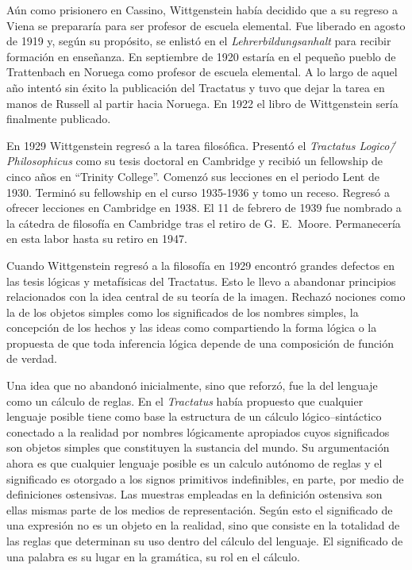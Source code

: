
Aún como prisionero en Cassino, Wittgenstein había decidido que a su regreso a
Viena se prepararía para ser profesor de escuela
elemental\autocite[cf.~][p.~158]{monk1991duty}. Fue liberado en agosto de 1919
y, según su propósito, se enlistó en el \emph{Lehrerbildungsanhalt} para recibir
formación en enseñanza. En septiembre de 1920 estaría en el pequeño pueblo de
Trattenbach en Noruega como profesor de escuela elemental. A lo largo de aquel
año intentó sin éxito la publicación del Tractatus y tuvo que dejar la tarea en
manos de Russell al partir hacia Noruega. En 1922 el libro de Wittgenstein sería
finalmente publicado.

En 1929 Wittgenstein regresó a la tarea filosófica. Presentó el \emph{Tractatus
  Logico\=/Philosophicus} como su tesis doctoral en Cambridge y recibió un
fellowship de cinco años en ``Trinity College''. Comenzó sus lecciones en el
periodo Lent de 1930. Terminó su fellowship en el curso 1935-1936 y tomo un
receso. Regresó a ofrecer lecciones en Cambridge en 1938. El 11 de febrero de
1939 fue nombrado a la cátedra de filosofía en Cambridge tras el retiro de
G.~E.~Moore. Permanecería en esta labor hasta su retiro en 1947.

Cuando Wittgenstein regresó a la filosofía en 1929 encontró grandes defectos en
las tesis lógicas y metafísicas del Tractatus. Esto le llevo a abandonar
principios relacionados con la idea central de su teoría de la imagen. Rechazó
nociones como la de los objetos simples como los significados de los nombres
simples, la concepción de los hechos y las ideas como compartiendo la forma
lógica o la propuesta de que toda inferencia lógica depende de una composición
de función de verdad\autocite[cf.~][p.~44]{rulesngrammar}.

Una idea que no abandonó inicialmente, sino que reforzó, fue la del lenguaje
como un cálculo de reglas. En el \emph{Tractatus} había propuesto que cualquier
lenguaje posible tiene como base la estructura de un cálculo lógico--sintáctico
conectado a la realidad por nombres lógicamente apropiados cuyos significados
son objetos simples que constituyen la sustancia del mundo. Su argumentación
ahora es que cualquier lenguaje posible es un calculo autónomo de reglas y el
significado es otorgado a los signos primitivos indefinibles, en parte, por
medio de definiciones ostensivas. Las muestras empleadas en la definición
ostensiva son ellas mismas parte de los medios de representación. Según esto el
significado de una expresión no es un objeto en la realidad, sino que consiste
en la totalidad de las reglas que determinan su uso dentro del cálculo del
lenguaje. El significado de una palabra es su lugar en la gramática, su rol en
el cálculo\autocite[cf.~][p.44]{rulesngrammar}.

